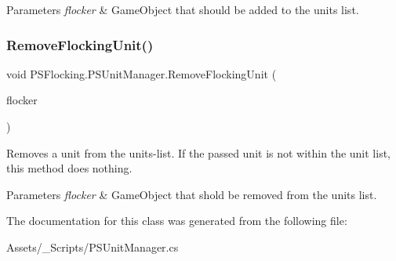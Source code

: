 \begin{DoxyParams}{Parameters}
{\em flocker} & Game\+Object that should be added to the units list. \\
\hline
\end{DoxyParams}
\mbox{\label{class_p_s_flocking_1_1_p_s_unit_manager_af7ec7299b52dc9206629f92dcfb601d2}} 
\subsubsection{\texorpdfstring{Remove\+Flocking\+Unit()}{RemoveFlockingUnit()}}
{\footnotesize\ttfamily void P\+S\+Flocking.\+P\+S\+Unit\+Manager.\+Remove\+Flocking\+Unit (\begin{DoxyParamCaption}\item[{Game\+Object}]{flocker }\end{DoxyParamCaption})}



Removes a unit from the units-\/list. If the passed unit is not within the unit list, this method does nothing. 


\begin{DoxyParams}{Parameters}
{\em flocker} & Game\+Object that shold be removed from the units list. \\
\hline
\end{DoxyParams}


The documentation for this class was generated from the following file\+:\begin{DoxyCompactItemize}
\item 
Assets/\+\_\+\+Scripts/P\+S\+Unit\+Manager.\+cs\end{DoxyCompactItemize}
